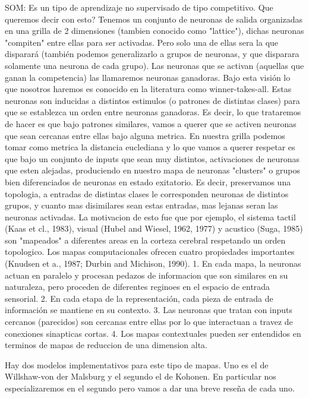 SOM:
Es un tipo de aprendizaje no supervisado de tipo competitivo. Que queremos decir con esto? Tenemos un conjunto de neuronas de salida organizadas en una grilla de 2 dimensiones (tambien conocido como "lattice"), dichas neuronas "compiten" entre ellas para ser activadas. Pero solo una de ellas sera la que disparará (también podemos generalizarlo a grupos de neuronas, y que disparara solamente una neurona de cada grupo). Las neuronas que se activan (aquellas que ganan la competencia) las llamaremos neuronas ganadoras. Bajo esta visión lo que nosotros haremos es conocido en la literatura como winner-takes-all. Estas neuronas son inducidas a distintos estimulos (o patrones de distintas clases) para que se establezca un orden entre neuronas ganadoras. Es decir, lo que trataremos de hacer es que bajo patrones similares, vamos a querer que se activen neuronas que sean cercanas entre ellas bajo alguna metrica. En nuestra grilla podemos tomar como metrica la distancia euclediana y lo que vamos a querer respetar es que bajo un conjunto de inputs que sean muy distintos, activaciones de neuronas que esten alejadas, produciendo en nuestro mapa de neuronas "clusters" o grupos bien diferenciados de neuronas en estado exitatorio. Es decir, preservamos una topologia, a entradas de distintas clases le corresponden neuronas de distintos grupos, y cuanto mas disimilares sean estas entradas, mas lejanas seran las neuronas activadas. La motivacion de esto fue que por ejemplo, el sistema tactil (Kaas et cl., 1983), visual (Hubel and Wiesel, 1962, 1977) y acustico (Suga, 1985) son "mapeados" a diferentes areas en la corteza cerebral respetando un orden topologico.
Los mapas computacionales ofrecen cuatro propiedades importantes (Knudsen et a., 1987; Durbin and Michison, 1990).
1. En cada mapa, la neuronas actuan en paralelo y procesan pedazos de informacion que son similares en su naturaleza, pero proceden de diferentes reginoes en el espacio de entrada sensorial.
2. En cada etapa de la representación, cada pieza de entrada de información se mantiene en su contexto.
3. Las neuronas que tratan con inputs cercanos (parecidos) son cercanas entre ellas por lo que interactuan a travez de conexiones sinapticas cortas.
4. Los mapas contextuales pueden ser entendidos en terminos de mapas de reduccion de una dimension alta.

Hay dos modelos implementativos para este tipo de mapas. Uno es el de Willshaw-von der Malsburg y el segundo el de Kohonen. En particular nos especializaremos en el segundo pero vamos a dar una breve reseña de cada uno.

